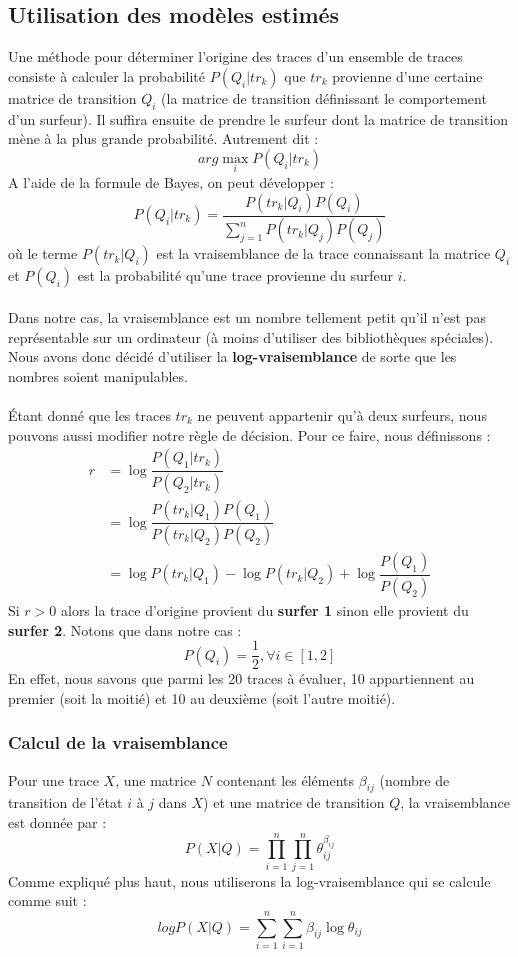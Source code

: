 \documentclass[a4paper,titlepage]{report}
\begin{document}
\subsection{Utilisation des modèles estimés}
\label{ssec:util_esti}
Une méthode pour déterminer l'origine des traces d'un ensemble de traces consiste à calculer la probabilité $P(Q_i|tr_k)$ que $tr_k$ provienne d'une certaine matrice de transition $Q_i$ (la matrice de transition définissant le comportement d'un surfeur). Il suffira ensuite de prendre le surfeur dont la matrice de transition mène à la plus grande probabilité. Autrement dit : 
\[
arg \max\limits_i P(Q_i|tr_k)
\]
A l'aide de la formule de Bayes, on peut développer : 
\[
P(Q_i|tr_k) = \dfrac{P(tr_k|Q_i) P(Q_i)}{\sum\limits_{j = 1}^n P(tr_k|Q_j) P(Q_j)}
\]
où le terme $P(tr_k|Q_i)$ est la vraisemblance de la trace connaissant la matrice $Q_i$ et $P(Q_i)$ est la probabilité qu'une trace provienne du surfeur $i$.
\paragraph{}
Dans notre cas, la vraisemblance est un nombre tellement petit qu'il n'est pas représentable sur un ordinateur (à moins d'utiliser des bibliothèques spéciales). Nous avons donc décidé d'utiliser la \textbf{log-vraisemblance} de sorte que les nombres soient manipulables. 
\paragraph{} 
Étant donné que les traces $tr_k$ ne peuvent appartenir qu'à deux surfeurs, nous pouvons aussi modifier notre règle de décision. Pour ce faire, nous définissons :
\[
\begin{aligned}
r &= \log \dfrac{P(Q_1|tr_k)}{P(Q_2|tr_k)}\\
&= \log \dfrac{P(tr_k|Q_1) P(Q_1)}{P(tr_k|Q_2) P(Q_2)}\\
&= \log P(tr_k|Q_1) - \log P(tr_k|Q_2) + \log \dfrac{P(Q_1)}{P(Q_2)}
\end{aligned}
\]
Si $r > 0$ alors la trace d'origine provient du \textbf{surfer 1} sinon elle provient du \textbf{surfer 2}. Notons que dans notre cas :
\[ 
	P(Q_i) = \frac{1}{2}, \forall i \in [1,2]
\]
En effet, nous savons que parmi les 20 traces à évaluer, 10 appartiennent au premier (soit la moitié) et 10 au deuxième (soit l'autre moitié).  
\subsubsection{Calcul de la vraisemblance}
Pour une trace $X$, une matrice $N$ contenant les éléments $\beta_{ij}$ (nombre de transition de l'état $i$ à $j$ dans $X$) et une matrice de transition $Q$, la vraisemblance est donnée par : 
\[
P(X|Q) = \prod\limits_{i = 1}^n \prod\limits_{j = 1}^n \theta_{ij}^{\beta_{ij}}
\]
Comme expliqué plus haut, nous utiliserons la log-vraisemblance qui se calcule comme suit :
\[
log P(X|Q) = \sum\limits_{i = 1}^n\sum\limits_{i = 1}^n \beta_{ij} \log \theta_{ij}
\]
\end{document}
